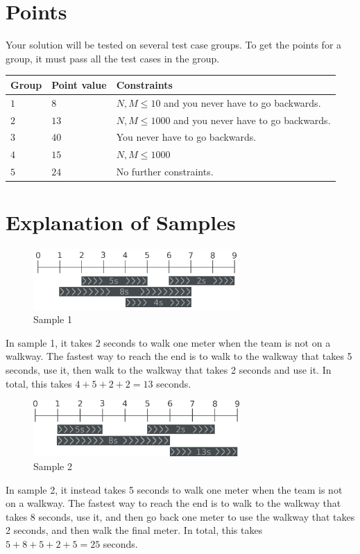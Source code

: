 \section*{Points}
Your solution will be tested on several test case groups.
To get the points for a group, it must pass all the test cases in the group.

\noindent
\begin{tabular}{| l | l | p{12cm} |}
  \hline
  \textbf{Group} & \textbf{Point value} & \textbf{Constraints} \\ \hline
  $1$   & $8$      & $N,M \le 10$ and you never have to go backwards. \\ \hline
  $2$   & $13$     & $N,M \le 1000$ and you never have to go backwards. \\ \hline
  $3$   & $40$     & You never have to go backwards. \\ \hline
  $4$   & $15$     & $N,M \le 1000$ \\ \hline
  $5$   & $24$     & No further constraints. \\ \hline
\end{tabular}


\section*{Explanation of Samples}

\begin{figure}[h]
	\centering
\includegraphics[width=0.7\textwidth]{sample1}
\caption{Sample 1}
\end{figure}
In sample 1, it takes 2 seconds to walk one meter when the team is not on a walkway.
The fastest way to reach the end is to walk to the walkway that takes 5 seconds, use it,
then walk to the walkway that takes 2 seconds and use it.
In total, this takes $4+5+2+2=13$ seconds.




\begin{figure}[h]
	\centering
\includegraphics[width=0.7\textwidth]{sample2}
\caption{Sample 2}
\end{figure}
In sample 2, it instead takes 5 seconds to walk one meter when the team is not on a walkway.
The fastest way to reach the end is to walk to the walkway that takes 8 seconds, use it, and then go back
one meter to use the walkway that takes 2 seconds, and then walk the final meter.
In total, this takes $5+8+5+2+5=25$ seconds.

